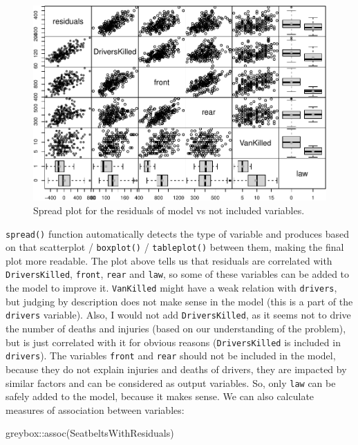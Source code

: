 \documentclass[
]{book}
\newenvironment{Shaded}{\begin{snugshade}}{\end{snugshade}}
\newcommand{\FunctionTok}[1]{\textcolor[rgb]{0.00,0.00,0.00}{#1}}
\newcommand{\NormalTok}[1]{#1}
\newcommand{\SpecialCharTok}[1]{\textcolor[rgb]{0.00,0.00,0.00}{#1}}
\theoremstyle{definition}
\theoremstyle{definition}
\theoremstyle{definition}
\theoremstyle{definition}
\theoremstyle{remark}
\begin{document}
\begin{figure}
\centering
\includegraphics{Svetunkov--2022----ADAM_files/figure-latex/carSeatsSpread-1.pdf}
\caption{\label{fig:carSeatsSpread}Spread plot for the residuals of model vs not included variables.}
\end{figure}

\texttt{spread()} function automatically detects the type of variable and produces based on that scatterplot / \texttt{boxplot()} / \texttt{tableplot()} between them, making the final plot more readable. The plot above tells us that residuals are correlated with \texttt{DriversKilled}, \texttt{front}, \texttt{rear} and \texttt{law}, so some of these variables can be added to the model to improve it. \texttt{VanKilled} might have a weak relation with \texttt{drivers}, but judging by description does not make sense in the model (this is a part of the \texttt{drivers} variable). Also, I would not add \texttt{DriversKilled}, as it seems not to drive the number of deaths and injuries (based on our understanding of the problem), but is just correlated with it for obvious reasons (\texttt{DriversKilled} is included in \texttt{drivers}). The variables \texttt{front} and \texttt{rear} should not be included in the model, because they do not explain injuries and deaths of drivers, they are impacted by similar factors and can be considered as output variables. So, only \texttt{law} can be safely added to the model, because it makes sense. We can also calculate measures of association between variables:

\begin{Shaded}
\begin{Highlighting}[]
\NormalTok{greybox}\SpecialCharTok{::}\FunctionTok{assoc}\NormalTok{(SeatbeltsWithResiduals)}
\end{Highlighting}
\end{Shaded}
\end{document}
